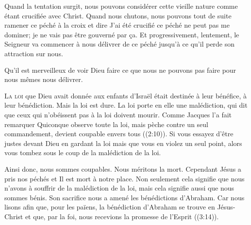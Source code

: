 
Quand la tentation surgit, nous pouvons considérer cette vieille nature
 comme étant crucifiée avec Christ. Quand nous chutons, nous pouvons
 tout de suite ramener ce péché à la croix et dire\frcolon {}
 \Og J'ai été crucifié \ocadr ce péché ne peut pas me dominer;
 je ne vais pas être gouverné par \c{c}a. \Fg{}
 Et progressivement, lentement, le Seigneur va commencer à nous délivrer
 de ce péché jusqu'à ce qu'il perde son attraction sur nous.

Qu'il est merveilleux de voir Dieu faire ce que nous ne pouvons pas faire
 pour nous mêmes \ocadr nous délivrer.

\dvrule






\lettrine{L}{a loi} que Dieu avait donnée aux enfants d'Israël
 était destinée à leur bénéfice, à leur bénédiction.
 Mais la loi est dure. La loi porte en elle une malédiction,
 qui dit que ceux qui n'obéissent pas à la loi doivent mourir.
 Comme Jacques l'a fait remarquer\frcolon {}
 \Og Quiconque observe toute la loi, mais pèche contre un seul commandement,
 devient coupable envers tous \Fg{} ((2:10)).
 Si vous essayez d'être justes devant Dieu en gardant la loi
 mais que vous en violez un seul point,
 alors vous tombez sous le coup de la malédiction de la loi.

Ainsi donc, nous sommes coupables. Nous méritons la mort.
 Cependant Jésus a pris nos péchés et Il est mort à notre place.
 Non seulement cela signifie que nous n'avons à souffrir de la malédiction
 de la loi, mais cela signifie aussi que nous sommes bénis.
 Son sacrifice nous a amené les bénédictions d'Abraham.
 Car nous lisons\frcolon {}
 \Og afin que, pour les païens, la bénédiction d'Abraham se trouve
 en Jésus-Christ et que, par la foi, nous recevions la promesse
 de l'Esprit \Fg{} ((3:14)).

